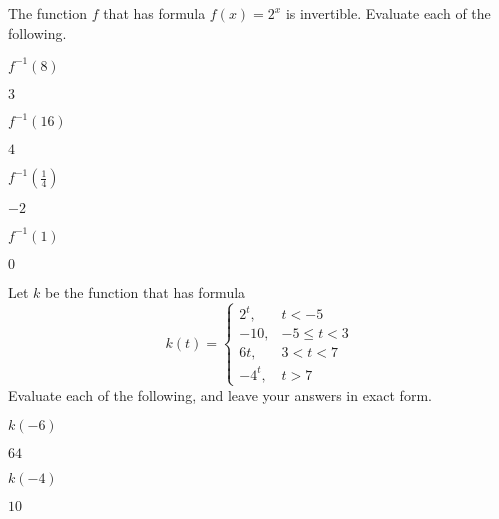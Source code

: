 \begin{exercises}
\begin{problem}
The function $f$ that has formula $f(x)=2^x$ is invertible. Evaluate 
each of the following.
\begin{multicols}{4}
	\begin{subproblem}
		$f^{-1}(8)$ 
		\begin{shortsolution}
			$3$ 
		\end{shortsolution}
	\end{subproblem}
	\begin{subproblem}
		$f^{-1}(16)$ 
		\begin{shortsolution}
			$4$ 
		\end{shortsolution}
	\end{subproblem}
	\begin{subproblem}
		$f^{-1}\left( \frac{1}{4} \right)$ 
		\begin{shortsolution}
			$-2$ 
		\end{shortsolution}
	\end{subproblem}
	\begin{subproblem}
		$f^{-1}(1)$ 
		\begin{shortsolution}
			$0$ 
		\end{shortsolution}
	\end{subproblem}
\end{multicols}
\end{problem}
\begin{problem}
Let $k$ be the function that has formula
\[
	k(t)=
	\begin{cases}
		2^t,  & t<-5        \\
		-10,  & -5\leq t< 3 \\
		6t,   & 3<t< 7      \\
		-4^t, & t>7         
	\end{cases}
\]
Evaluate each of the following, and leave your answers in exact form.
\begin{multicols}{4}
	\begin{subproblem}
		$k(-6)$
		\begin{shortsolution}
			$64$ 
		\end{shortsolution}
	\end{subproblem}
	\begin{subproblem}
		$k(-4)$
		\begin{shortsolution}
			$10$ 
		\end{shortsolution}
	\end{subproblem}
	\begin{subproblem}

\end{subproblem}
\end{multicols}
\end{problem}
\end{exercises}
